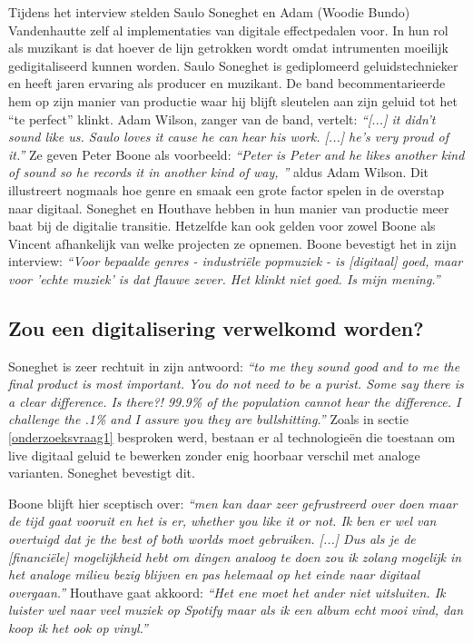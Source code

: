 Tijdens het interview stelden Saulo Soneghet en Adam (Woodie Bundo) Vandenhautte zelf al implementaties van digitale effectpedalen voor. In hun rol als muzikant is dat hoever de lijn getrokken wordt omdat intrumenten moeilijk gedigitaliseerd kunnen worden. Saulo Soneghet is gediplomeerd geluidstechnieker en heeft jaren ervaring als producer en muzikant. De band becommentarieerde hem op zijn manier van productie waar hij blijft sleutelen aan zijn geluid tot het ``te perfect'' klinkt. Adam Wilson, zanger van de band, vertelt: \textit{``[...] it didn't sound like us. Saulo loves it cause he can hear his work. [...] he's very proud of it.''} Ze geven Peter Boone als voorbeeld: \textit{``Peter is Peter and he likes another kind of sound so he records it in another kind of way, ''} aldus Adam Wilson. \autocite{vagabundos} Dit illustreert nogmaals hoe genre en smaak een grote factor spelen in de overstap naar digitaal. Soneghet en Houthave hebben in hun manier van productie meer baat bij de digitalie transitie. Hetzelfde kan ook gelden voor zowel Boone als Vincent afhankelijk van welke projecten ze opnemen. Boone bevestigt het in zijn interview: \textit{``Voor bepaalde genres - industriële popmuziek - is [digitaal] goed, maar voor 'echte muziek' is dat flauwe zever. Het klinkt niet goed. Is mijn mening.''}

\subsection{Zou een digitalisering verwelkomd worden?}

Soneghet is zeer rechtuit in zijn antwoord: \textit{``to me they sound good and to me the final product is most important. You do not need to be a purist. Some say there is a clear difference. Is there?! 99.9\% of the population cannot hear the difference. I challenge the .1\% and I assure you they are bullshitting.''} \autocite{vagabundos} Zoals in sectie \ref{onderzoeksvraag1} besproken werd, bestaan er al technologieën die toestaan om live digitaal geluid te bewerken zonder enig hoorbaar verschil met analoge varianten. Soneghet bevestigt dit.

Boone blijft hier sceptisch over: \textit{``men kan daar zeer gefrustreerd over doen maar de tijd gaat vooruit en het is er, whether you like it or not. Ik ben er wel van overtuigd dat je the best of both worlds moet gebruiken. [...] Dus als je de [financiële] mogelijkheid hebt om dingen analoog te doen zou ik zolang mogelijk in het analoge milieu bezig blijven en pas helemaal op het einde naar digitaal overgaan.''} \autocite{peterboone} Houthave gaat akkoord: \textit{``Het ene moet het ander niet uitsluiten. Ik luister wel naar veel muziek op Spotify maar als ik een album echt mooi vind, dan koop ik het ook op vinyl.''} \autocite{thomashouthave}

